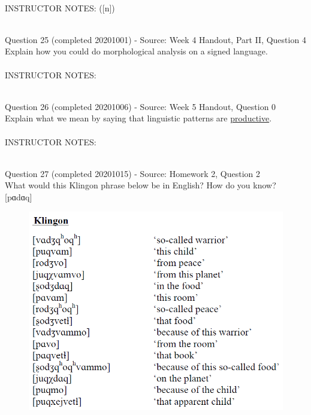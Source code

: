 \documentclass[12pt]{article}
\begin{document}
~\\
INSTRUCTOR NOTES: ([n])


~\\

{\large Question 25} (completed 20201001) - Source: Week 4 Handout, Part II, Question 4\\

Explain how you could do morphological analysis on a signed language.\\


~\\
INSTRUCTOR NOTES: 


~\\

{\large Question 26} (completed 20201006) - Source: Week 5 Handout, Question 0\\

Explain what we mean by saying that linguistic patterns are \underline{productive}.\\


~\\
INSTRUCTOR NOTES: 


~\\

{\large Question 27} (completed 20201015) - Source: Homework 2, Question 2\\

What would this Klingon phrase below be in English? How do you know?\\

{[pɑdɑq]}

\begin{figure}[H]
\includegraphics{../images/klingon.png}
\end{figure}
\end{document}
